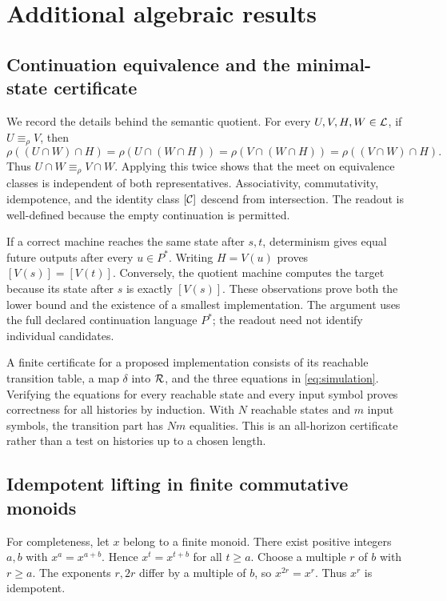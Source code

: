 \section{Additional algebraic results}\label{app:algebra}
\subsection{Continuation equivalence and the minimal-state certificate}
We record the details behind the semantic quotient. For every $U,V,H,W\in\mathcal L$, if $U\equiv_\rho V$, then
\[
 \rho((U\cap W)\cap H)=\rho(U\cap(W\cap H))
 =\rho(V\cap(W\cap H))=\rho((V\cap W)\cap H).
\]
Thus $U\cap W\equiv_\rho V\cap W$. Applying this twice shows that the meet on equivalence classes is independent of both representatives. Associativity, commutativity, idempotence, and the identity class $[\mathcal C]$ descend from intersection. The readout is well-defined because the empty continuation is permitted.

If a correct machine reaches the same state after $s,t$, determinism gives equal future outputs after every $u\in P^*$. Writing $H=V(u)$ proves $[V(s)]=[V(t)]$. Conversely, the quotient machine computes the target because its state after $s$ is exactly $[V(s)]$. These observations prove both the lower bound and the existence of a smallest implementation. The argument uses the full declared continuation language $P^*$; the readout need not identify individual candidates.

A finite certificate for a proposed implementation consists of its reachable transition table, a map $\delta$ into $\mathcal R$, and the three equations in \eqref{eq:simulation}. Verifying the equations for every reachable state and every input symbol proves correctness for all histories by induction. With $N$ reachable states and $m$ input symbols, the transition part has $Nm$ equalities. This is an all-horizon certificate rather than a test on histories up to a chosen length.

\subsection{Idempotent lifting in finite commutative monoids}\label{app:monoid}
For completeness, let $x$ belong to a finite monoid. There exist positive integers $a,b$ with $x^a=x^{a+b}$. Hence $x^t=x^{t+b}$ for all $t\ge a$. Choose a multiple $r$ of $b$ with $r\ge a$. The exponents $r,2r$ differ by a multiple of $b$, so $x^{2r}=x^r$. Thus $x^r$ is idempotent.

